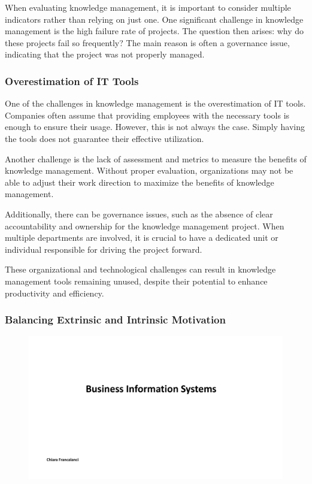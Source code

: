 When evaluating knowledge management, it is important to consider
multiple indicators rather than relying on just one. One significant
challenge in knowledge management is the high failure rate of projects.
The question then arises: why do these projects fail so frequently? The
main reason is often a governance issue, indicating that the project was
not properly managed.

\subsubsection{Overestimation of IT
  Tools}\label{overestimation-of-it-tools}

One of the challenges in knowledge management is the overestimation of
IT tools. Companies often assume that providing employees with the
necessary tools is enough to ensure their usage. However, this is not
always the case. Simply having the tools does not guarantee their
effective utilization.

Another challenge is the lack of assessment and metrics to measure the
benefits of knowledge management. Without proper evaluation,
organizations may not be able to adjust their work direction to maximize
the benefits of knowledge management.

Additionally, there can be governance issues, such as the absence of
clear accountability and ownership for the knowledge management project.
When multiple departments are involved, it is crucial to have a
dedicated unit or individual responsible for driving the project
forward.

These organizational and technological challenges can result in
knowledge management tools remaining unused, despite their potential to
enhance productivity and efficiency.

\subsubsection{Balancing Extrinsic and Intrinsic
  Motivation}\label{balancing-extrinsic-and-intrinsic-motivation}

\begin{figure}[!h]
  \centering
  \includegraphics[page=19, trim = 1.5cm 3.6cm 1.5cm 3cm, clip, width=\imagewidth]{images/05 - KM.pdf}
\end{figure}

